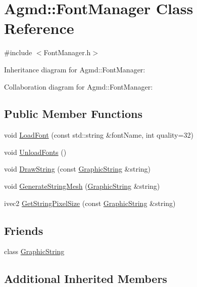 \hypertarget{class_agmd_1_1_font_manager}{\section{Agmd\+:\+:Font\+Manager Class Reference}
\label{class_agmd_1_1_font_manager}
}


{\ttfamily \#include $<$Font\+Manager.\+h$>$}



Inheritance diagram for Agmd\+:\+:Font\+Manager\+:


Collaboration diagram for Agmd\+:\+:Font\+Manager\+:
\subsection*{Public Member Functions}
\begin{DoxyCompactItemize}
\item 
void \hyperlink{class_agmd_1_1_font_manager_afa2ec2af9580873775a6d10070c3fa0d}{Load\+Font} (const std\+::string \&font\+Name, int quality=32)
\item 
void \hyperlink{class_agmd_1_1_font_manager_a09ead7e7b82e41bd8df44f4f0560079f}{Unload\+Fonts} ()
\item 
void \hyperlink{class_agmd_1_1_font_manager_a1c98d7c6bcc040ecfc157921e051272d}{Draw\+String} (const \hyperlink{class_agmd_1_1_graphic_string}{Graphic\+String} \&string)
\item 
void \hyperlink{class_agmd_1_1_font_manager_a61c834b443445b2677bfdaee356e1d85}{Generate\+String\+Mesh} (\hyperlink{class_agmd_1_1_graphic_string}{Graphic\+String} \&string)
\item 
ivec2 \hyperlink{class_agmd_1_1_font_manager_a57d9028784b60b4ab1e993ad9363ebc2}{Get\+String\+Pixel\+Size} (const \hyperlink{class_agmd_1_1_graphic_string}{Graphic\+String} \&string)
\end{DoxyCompactItemize}
\subsection*{Friends}
\begin{DoxyCompactItemize}
\item 
class \hyperlink{class_agmd_1_1_font_manager_a971cc7a00cba96fee3ed8f4278f2a6be}{Graphic\+String}
\end{DoxyCompactItemize}
\subsection*{Additional Inherited Members}


